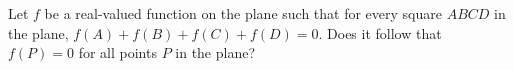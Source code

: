 Let $f$ be a real-valued function on the plane such that for every
square $ABCD$ in the plane, $f(A)+f(B)+f(C)+f(D)=0$. Does it follow that
$f(P)=0$ for all points $P$ in the plane?
